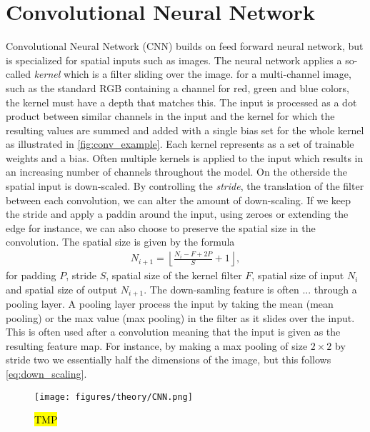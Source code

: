 \section{Convolutional Neural Network}
Convolutional Neural Network (\acrshort{CNN}) builds on feed forward neural
network, but is specialized for spatial inputs such as images. The neural
network applies a so-called \textit{kernel} which is a filter sliding over the
image. for a multi-channel image, such as the standard RGB containing a channel
for red, green and blue colors, the kernel must have a depth that matches this.
The input is processed as a dot product between similar channels in the input
and the kernel for which the resulting values are summed and added with a single
bias set for the whole kernel as illustrated in \cref{fig:conv_example}. Each
kernel represents as a set of trainable weights and a bias. Often multiple
kernels is applied to the input which results in an increasing number of
channels throughout the model. On the otherside the spatial input is
down-scaled. By controlling the \textit{stride}, the translation of the filter
between each convolution, we can alter the amount of down-scaling. If we keep
the stride and apply a paddin around the input, using zeroes or extending the
edge for instance, we can also choose to preserve the spatial size in the
convolution. The spatial size is given by the formula 
\begin{align}
  N_{i+1} = \left\lfloor \frac{N_i - F + 2P}{S} + 1 \right\rfloor,
  \label{eq:down_scaling}
\end{align}
for padding $P$, stride $S$, spatial size of the kernel filter $F$, spatial size
of input $N_i$ and spatial size of output $N_{i+1}$. The down-samling feature is
often ... through a pooling layer. A pooling layer process the input by taking
the mean (mean pooling) or the max value (max pooling) in the filter as it
slides over the input. This is often used after a convolution meaning that the
input is given as the resulting feature map. For instance, by making a max
pooling of size $2 \times 2$ by stride two we essentially half the dimensions of
the image, but this follows \cref{eq:down_scaling}. 


\begin{figure}[H]
  \centering
  \texttt{[image: figures/theory/CNN.png]}
  \caption{\hl{TMP}}
  \label{fig:CNN}
\end{figure}


